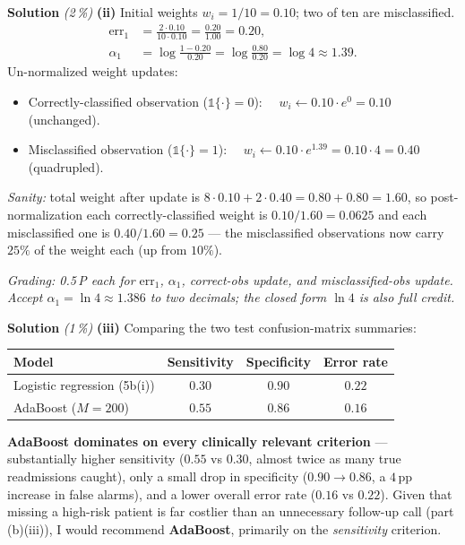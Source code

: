 \documentclass[11pt,a4paper]{article}
\newcommand{\subpoints}[1]{\textit{(#1\,\%)}}
\newcommand{\sol}{\noindent\textbf{Solution}}
\begin{document}
\medskip
\sol{} \subpoints{2} \textbf{(ii)} Initial weights $w_i = 1/10 = 0.10$; two of ten are
misclassified.
\begin{align*}
\mathrm{err}_1 &= \frac{2\cdot 0.10}{10\cdot 0.10} = \frac{0.20}{1.00} = \boxed{0.20}, \\
\alpha_1 &= \log\frac{1 - 0.20}{0.20} = \log\frac{0.80}{0.20} = \log 4 \approx \boxed{1.39}.
\end{align*}
Un-normalized weight updates:
\begin{itemize}
  \item Correctly-classified observation ($\mathbb{1}\{\cdot\} = 0$):
       $\quad w_i \leftarrow 0.10 \cdot e^{0} = \boxed{0.10}$ (unchanged).
  \item Misclassified observation ($\mathbb{1}\{\cdot\} = 1$):
       $\quad w_i \leftarrow 0.10 \cdot e^{1.39} = 0.10 \cdot 4 = \boxed{0.40}$ (quadrupled).
\end{itemize}
\emph{Sanity:} total weight after update is $8\cdot 0.10 + 2\cdot 0.40 = 0.80 + 0.80 = 1.60$, so
post-normalization each correctly-classified weight is $0.10/1.60 = 0.0625$ and each
misclassified one is $0.40/1.60 = 0.25$ --- the misclassified observations now carry $25\%$ of
the weight each (up from $10\%$).

\noindent\emph{Grading: 0.5\,P each for $\mathrm{err}_1$, $\alpha_1$, correct-obs update, and
misclassified-obs update. Accept $\alpha_1 = \ln 4 \approx 1.386$ to two decimals; the closed
form $\ln 4$ is also full credit.}

\medskip
\sol{} \subpoints{1} \textbf{(iii)} Comparing the two test confusion-matrix summaries:
\begin{center}
\begin{tabular}{lccc}
\toprule
Model & Sensitivity & Specificity & Error rate \\
\midrule
Logistic regression (5b(i)) & $0.30$ & $0.90$ & $0.22$ \\
AdaBoost ($M=200$)          & $0.55$ & $0.86$ & $0.16$ \\
\bottomrule
\end{tabular}
\end{center}
\textbf{AdaBoost dominates on every clinically relevant criterion} --- substantially higher
sensitivity ($0.55$ vs $0.30$, almost twice as many true readmissions caught), only a small drop
in specificity ($0.90 \to 0.86$, a $4$\,pp increase in false alarms), and a lower overall error
rate ($0.16$ vs $0.22$). Given that missing a high-risk patient is far costlier than an
unnecessary follow-up call (part (b)(iii)), I would recommend \textbf{AdaBoost}, primarily on the
\emph{sensitivity} criterion.
\end{document}

